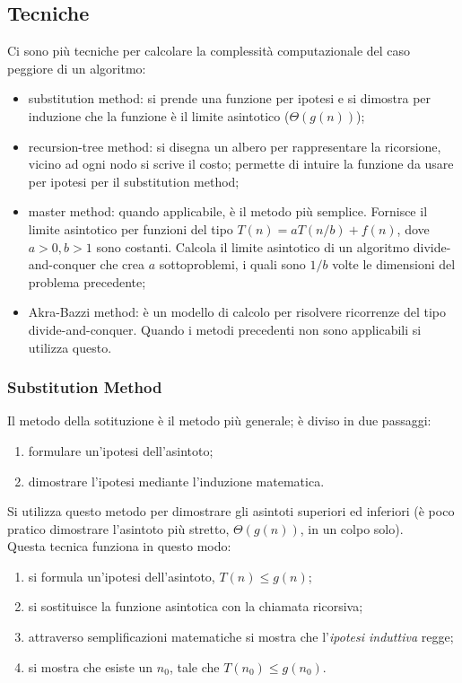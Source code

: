 \documentclass{article}
\begin{document}
\subsection{Tecniche}
Ci sono più tecniche per calcolare la complessità computazionale del caso
peggiore di un algoritmo:
\begin{itemize}
	\item substitution method: si prende una funzione per ipotesi e si dimostra
	      per induzione che la funzione è il limite asintotico ($\Theta(g(n))$);
	\item recursion-tree method: si disegna un albero per rappresentare la
	      ricorsione, vicino ad ogni nodo si scrive il costo; permette di intuire
	      la funzione da usare per ipotesi per il substitution method;
	\item master method: quando applicabile, è il metodo più semplice. Fornisce
	      il limite asintotico per funzioni del tipo $T(n) = aT(n/b) + f(n)$, dove
	      $a>0, b>1$ sono costanti. Calcola il limite asintotico di un algoritmo
	      divide-and-conquer che crea $a$ sottoproblemi, i quali sono $1/b$ volte
	      le dimensioni del problema precedente;
	\item Akra-Bazzi method: è un modello di calcolo per risolvere ricorrenze
	      del tipo divide-and-conquer. Quando i metodi precedenti non sono
	      applicabili si utilizza questo.
\end{itemize}

\subsubsection{Substitution Method}
Il metodo della sotituzione è il metodo più generale; è diviso in due passaggi:
\begin{enumerate}
	\item formulare un'ipotesi dell'asintoto;
	\item dimostrare l'ipotesi mediante l'induzione matematica.
\end{enumerate}

Si utilizza questo metodo per dimostrare gli asintoti superiori ed inferiori (è
poco pratico dimostrare l'asintoto più stretto, $\Theta(g(n))$, in un colpo
solo).\\
Questa tecnica funziona in questo modo:
\begin{enumerate}
	\item si formula un'ipotesi dell'asintoto, $T(n) \leq g(n)$;
	\item si sostituisce la funzione asintotica con la chiamata ricorsiva;
	\item attraverso semplificazioni matematiche si mostra che l'\textit{ipotesi
		      induttiva} regge;
	\item si mostra che esiste un $n_0$, tale che $T(n_0) \leq g(n_0)$.
\end{enumerate}
\end{document}
